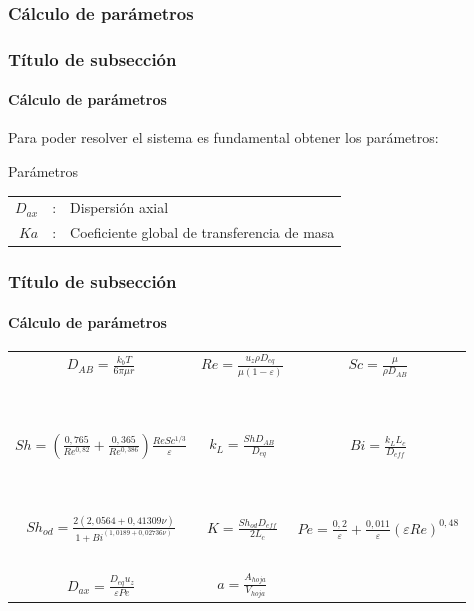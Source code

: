 \documentclass[aspectratio=1610]{beamer}
\newcommand{\ssec}{Título de subsección}
\begin{document}
\subsubsection{Cálculo de parámetros}
\begin{frame}
	\frametitle{\ssec}
	\framesubtitle{Cálculo de parámetros}
	Para poder resolver el sistema es fundamental obtener los parámetros:
	
	\begin{block}{Parámetros}
	\begin{tabular}{rrl}
	$D_{ax}$ &:& Dispersión axial \\
	$Ka$ &:& Coeficiente global de transferencia de masa\\
	\end{tabular}
	\end{block}
\end{frame}
\begin{frame}
	\frametitle{\ssec}
	\framesubtitle{Cálculo de parámetros}
	\begin{center}
	\begin{tabular}{ccc}
	$D_{AB} = \frac{k_bT}{6\pi \mu r}$ &
	$Re = \frac{u_z \rho D_{eq}}{\mu (1-\varepsilon)}$ &
	$Sc = \frac{\mu}{\rho D_{AB}}$ 
	\\
	~
	\\
	~
	\\
	$Sh = (\frac{0,765}{Re^{0,82}} + \frac{0,365}{Re^{0,386}})\frac{Re Sc^{1/3}}{\varepsilon}$&
	$k_L = \frac{Sh D_{AB}}{D_{eq}}$ &
	$Bi = \frac{k_L L_c}{D_{eff}}$
	\\
	~
	\\
	~
	\\
	$Sh_{od} = \frac{2(2,0564 + 0,41309 \nu)}{1 + Bi^{(1,0189 + 0,02736 \nu)}}$ &
	$K = \frac{Sh_{od}D_{eff}}{2L_c}$ &
	$Pe = \frac{0,2}{\varepsilon} + \frac{0,011}{\varepsilon}(\varepsilon Re)^{0,48}$
	\\
	~
	\\
	$D_{ax} = \frac{D_{eq}u_z}{\varepsilon Pe}$ & 
	$a = \frac{A_{hoja}}{V_{hoja}}$
	\\
	\end{tabular}
	\end{center}
\end{frame}
\end{document}
